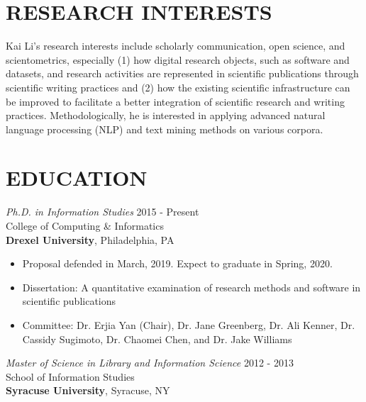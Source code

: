 \documentclass[margin, 10pt]{res} %
\begin{document}
\begin{resume}

 
\section{RESEARCH INTERESTS}  

Kai Li's research interests include scholarly communication, open science, and scientometrics, especially (1) how digital research objects, such as software and datasets, and research activities are represented in scientific publications through scientific writing practices and (2) how the existing scientific infrastructure can be improved to facilitate a better integration of scientific research and writing practices. Methodologically, he is interested in applying advanced natural language processing (NLP) and text mining methods on various corpora.

 
\section{EDUCATION}

{\sl Ph.D. in Information Studies} \hfill 2015 - Present \\
College of Computing \& Informatics\\
\textbf{Drexel University}, Philadelphia, PA
\begin{itemize}
\item Proposal defended in March, 2019. Expect to graduate in Spring, 2020.
\item Dissertation: A quantitative examination of research methods and software in scientific publications
\item Committee: Dr. Erjia Yan (Chair), Dr. Jane Greenberg, Dr. Ali Kenner, Dr. Cassidy Sugimoto, Dr. Chaomei Chen, and Dr. Jake Williams
\end{itemize} 

{\sl Master of Science in Library and Information Science} \hfill 2012 - 2013 \\
School of Information Studies\\
\textbf{Syracuse University}, Syracuse, NY
 

\end{resume}
\end{document}
